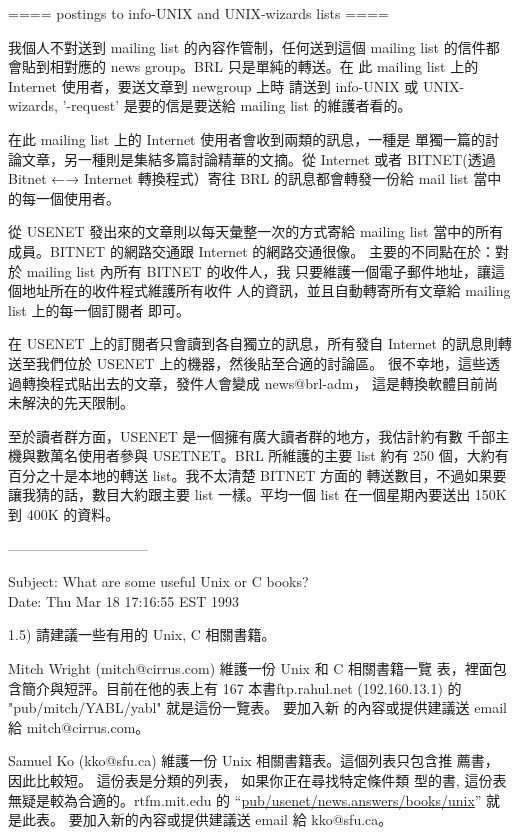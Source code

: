 \documentclass{letter}
\begin{document}
\begin{CJK}{Bg5}{ming}
      ==== postings to info-UNIX and UNIX-wizards lists ====

      我個人不對送到 mailing list 的內容作管制，任何送到這個 mailing 
      list 的信件都會貼到相對應的 news group。BRL 只是單純的轉送。在
      此 mailing list 上的 Internet 使用者，要送文章到 newgroup 上時
      請送到 info-UNIX 或 UNIX-wizards, '-request' 是要的信是要送給 
      mailing list 的維護者看的。

      在此 mailing list 上的 Internet 使用者會收到兩類的訊息，一種是
      單獨一篇的討論文章，另一種則是集結多篇討論精華的文摘。從 
      Internet 或者 BITNET(透過 Bitnet ←→ Internet 轉換程式）寄往 
      BRL 的訊息都會轉發一份給 mail list 當中的每一個使用者。


      從 USENET 發出來的文章則以每天彙整一次的方式寄給 mailing list 
      當中的所有成員。BITNET 的網路交通跟 Internet 的網路交通很像。
      主要的不同點在於：對於 mailing list 內所有 BITNET 的收件人，我
      只要維護一個電子郵件地址，讓這個地址所在的收件程式維護所有收件
      人的資訊，並且自動轉寄所有文章給 mailing list 上的每一個訂閱者
      即可。

      在 USENET 上的訂閱者只會讀到各自獨立的訊息，所有發自 Internet 
      的訊息則轉送至我們位於 USENET 上的機器，然後貼至合適的討論區。
      很不幸地，這些透過轉換程式貼出去的文章，發件人會變成 news@brl-adm，
      這是轉換軟體目前尚未解決的先天限制。

      至於讀者群方面，USENET 是一個擁有廣大讀者群的地方，我估計約有數
      千部主機與數萬名使用者參與 USETNET。BRL 所維護的主要 list 約有 
      250 個，大約有百分之十是本地的轉送 list。我不太清楚 BITNET 方面的
      轉送數目，不過如果要讓我猜的話，數目大約跟主要 list 一樣。平均一個 
      list 在一個星期內要送出 150K 到 400K 的資料。


------------------------------

Subject: What are some useful Unix or C books? \\
Date: Thu Mar 18 17:16:55 EST 1993

1.5)  請建議一些有用的 Unix, C 相關書籍。

	Mitch  Wright (mitch@cirrus.com) 維護一份 Unix 和 C 相關書籍一覽
	表，裡面包含簡介與短評。目前在他的表上有 167 本書ftp.rahul.net 
	(192.160.13.1) 的 "pub/mitch/YABL/yabl" 就是這份一覽表。 要加入新
	的內容或提供建議送 email 給 mitch@cirrus.com。

	Samuel Ko (kko@sfu.ca) 維護一份 Unix 相關書籍表。這個列表只包含推
	薦書，因此比較短。 這份表是分類的列表， 如果你正在尋找特定條件類
	型的書, 這份表無疑是較為合適的。rtfm.mit.edu 的
	``\url{pub/usenet/news.answers/books/unix}''  就是此表。
	要加入新的內容或提供建議送 email 給 kko@sfu.ca。


\end{CJK}
\end{document}
